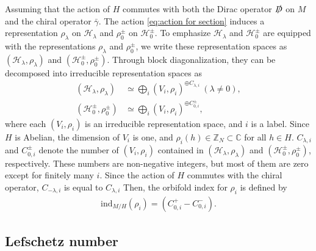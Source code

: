 \documentclass[11pt]{article}
\newcommand{\fix}[1]{\textcolor{red}{[#1]}}
\begin{document}

Assuming that the action of $ H$ commutes with both the Dirac operator $\slashed{D}$ on $M$ and the chiral operator $\bar{\gamma}$. %
The action \eqref{eq:action for section} induces a representation $\rho_\lambda$ on $\mathcal{H}_\lambda$ and $\rho_0^\pm $ on $\mathcal{H}_0^\pm$. 
To emphasize $\mathcal{H}_\lambda$ and $\mathcal{H}_0^\pm$ are equipped with the representations $\rho_\lambda$ and $\rho_0^\pm $, we write these representation spaces as $(\mathcal{H}_\lambda, \rho_\lambda)$ and $(\mathcal{H}_0^\pm, \rho_0^\pm)$. 
Through block diagonalization, they can be decomposed into irreducible representation spaces as
\begin{align}
    (\mathcal{H}_\lambda ,\rho_\lambda)& \simeq \bigoplus_{i } ( V_i  ,\rho_i)^{\oplus C_{\lambda,i}}~(\lambda \neq 0), \\
    (\mathcal{H}_0^{\pm} ,\rho_0^\pm)& \simeq \bigoplus_{i } ( V_i  ,\rho_i)^{\oplus C_{0,i}^{\pm}},
\end{align}
where each $(V_i,\rho_i)$ is an irreducible representation space, and $i$ is a label. Since $H$ is Abelian, the dimension of $V_i$ is one, and $\rho_i(h) \in \mathbb{Z}_N \subset \mathbb{C}$ for all $h\in H$. $C_{\lambda,i}$ and $C_{0,i}^\pm$ denote the number of $(V_i, \rho_i)$ contained in $(\mathcal{H}_\lambda ,\rho_\lambda)$ and $(\mathcal{H}_0^\pm ,\rho_0^\pm)$, respectively. These numbers are non-negative integers, but most of them are zero except for finitely many $i$. Since the action of $H$ commutes with the chiral operator, $C_{-\lambda,i}$ is equal to $C_{\lambda,i}$ Then, the orbifold index for $\rho_i$ is defined by
\begin{align}
    \text{ind}_{M/H} ( \rho_i)= (C_{0,i}^+ - C_{0,i}^-).
\end{align}






\subsection{Lefschetz number}
\end{document}
